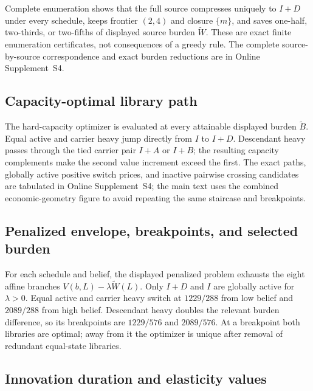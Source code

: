 Complete enumeration shows that the full source compresses uniquely to
\(I+D\) under every
schedule, keeps frontier \((2,4)\) and closure \(\{m\}\), and saves one-half,
two-thirds, or two-fifths of displayed source burden \(\widetilde W\).  These
are exact finite enumeration certificates, not consequences of a greedy
rule.  The complete
source-by-source correspondence and exact burden reductions are in Online
Supplement~S4.

\subsection{Capacity-optimal library path}

The hard-capacity optimizer is evaluated at every attainable displayed burden
\(\widetilde B\).  Equal active and carrier heavy jump directly from \(I\) to
\(I+D\).  Descendant heavy passes through the tied carrier pair \(I+A\) or
\(I+B\); the resulting capacity complements make the second value increment
exceed the first.
The exact paths, globally active positive switch prices, and inactive pairwise
crossing candidates are tabulated in Online Supplement~S4; the main text uses
the combined economic-geometry figure to avoid repeating the same staircase
and breakpoints.

\subsection{Penalized envelope, breakpoints, and selected burden}

For each schedule and belief, the displayed penalized problem exhausts the
eight affine branches \(V(b,L)-\lambda\widetilde W(L)\).  Only \(I+D\) and
\(I\) are globally active for \(\lambda>0\).  Equal active and carrier heavy
switch at \(1229/288\) from low belief and \(2089/288\) from high belief.
Descendant heavy doubles the relevant burden difference, so its breakpoints
are \(1229/576\) and \(2089/576\).  At a breakpoint both libraries are
optimal; away from it the optimizer is unique after removal of redundant
equal-state libraries.

\subsection{Innovation duration and elasticity values}

